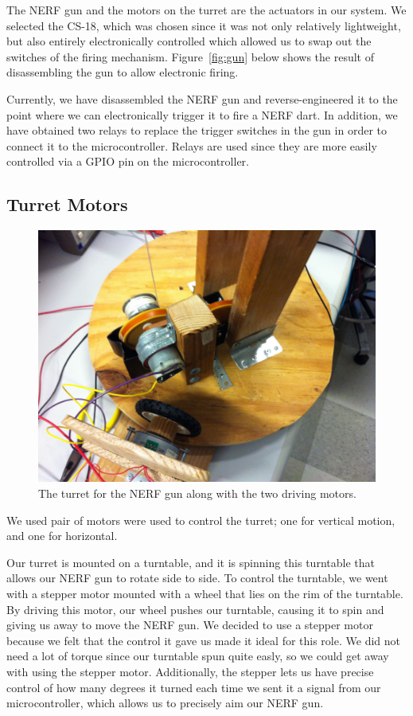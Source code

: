 \documentclass[journal]{IEEEtran}
\begin{document}
The NERF gun and the motors on the turret are the actuators in our system. We selected the CS-18, which was chosen since it was not only relatively lightweight, but also entirely electronically controlled which allowed us to swap out the switches of the firing mechanism. Figure~\ref{fig:gun} below shows the result of disassembling the gun to allow electronic firing.

Currently, we have disassembled the NERF gun and reverse-engineered it to the point where we can electronically trigger it to fire a NERF dart. In addition, we have obtained two relays to replace the trigger switches in the gun in order to connect it to the microcontroller. Relays are used since they are more easily controlled via a GPIO pin on the microcontroller.


\subsection{Turret Motors}

\begin{figure}[htbp]
    \centering
    \includegraphics[width=0.80\linewidth]{motors.jpg}
    \caption{The turret for the NERF gun along with the two driving motors.}
    \label{fig:motor}
\end{figure}

We used pair of motors were used to control the turret; one for vertical motion, and one for horizontal.

Our turret is mounted on a turntable, and it is spinning this turntable that allows our NERF gun to rotate side to side. To control the turntable, we went with a stepper motor mounted with a wheel that lies on the rim of the turntable. By driving this motor, our wheel pushes our turntable, causing it to spin and giving us away to move the NERF gun. We decided to use a stepper motor because we felt that the control it gave us made it ideal for this role. We did not need a lot of torque since our turntable spun quite easly, so we could get away with using the stepper motor. Additionally, the stepper lets us have precise control of how many degrees it turned each time we sent it a signal from our microcontroller, which allows us to precisely aim our NERF gun.
\end{document}
